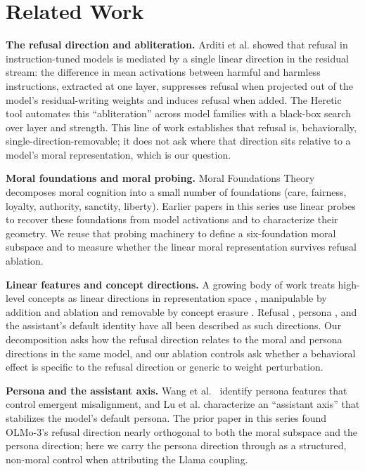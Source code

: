 \section{Related Work}\label{related-work}

\textbf{The refusal direction and abliteration.} Arditi et al.
\citep{arditi2024refusal} showed that refusal in instruction-tuned models is
mediated by a single linear direction in the residual stream: the difference in
mean activations between harmful and harmless instructions, extracted at one
layer, suppresses refusal when projected out of the model's residual-writing
weights and induces refusal when added. The Heretic tool \citep{pew2025heretic}
automates this ``abliteration'' across model families with a black-box search over
layer and strength. This line of work establishes that refusal is, behaviorally,
single-direction-removable; it does not ask where that direction sits relative to
a model's moral representation, which is our question.

\textbf{Moral foundations and moral probing.} Moral Foundations Theory
\citep{haidt2012righteous, graham2013mft} decomposes moral cognition into a small
number of foundations (care, fairness, loyalty, authority, sanctity, liberty).
Earlier papers in this series use linear probes
\citep{alain2017probes, belinkov2022probing} to recover these foundations from
model activations and to characterize their geometry. We reuse that probing
machinery to define a six-foundation moral subspace and to measure whether the
linear moral representation survives refusal ablation.

\textbf{Linear features and concept directions.} A growing body of work treats
high-level concepts as linear directions in representation space
\citep{park2024linear, bolukbasi2016gender}, manipulable by addition and ablation
\citep{zou2023representation} and removable by concept erasure
\citep{belrose2023leace}. Refusal \citep{arditi2024refusal}, persona
\citep{wang2025persona}, and the assistant's default identity
\citep{lu2026assistant} have all been described as such directions. Our
decomposition asks how the refusal direction relates to the moral and persona
directions in the same model, and our ablation controls ask whether a behavioral
effect is specific to the refusal direction or generic to weight perturbation.

\textbf{Persona and the assistant axis.} Wang et al.~\citep{wang2025persona} identify
persona features that control emergent misalignment, and Lu et al.
\citep{lu2026assistant} characterize an ``assistant axis'' that stabilizes the
model's default persona. The prior paper in this series found OLMo-3's refusal
direction nearly orthogonal to both the moral subspace and the persona direction;
here we carry the persona direction through as a structured, non-moral control
when attributing the Llama coupling.

